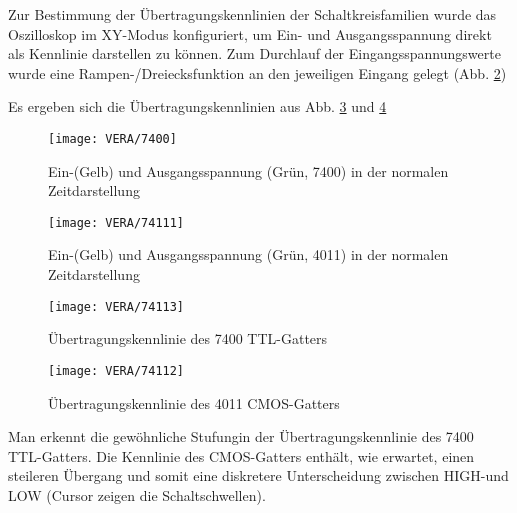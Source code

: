 Zur Bestimmung der Übertragungskennlinien der Schaltkreisfamilien wurde das
Oszilloskop im XY-Modus konfiguriert, um Ein- und Ausgangsspannung direkt als
Kennlinie darstellen zu können. Zum Durchlauf der Eingangsspannungswerte wurde
eine Rampen-/Dreiecksfunktion an den jeweiligen Eingang gelegt (Abb. \ref{fig:triangle}) 

Es ergeben sich die Übertragungskennlinien aus
Abb. \ref{fig:first} und \ref{fig:last}

  \begin{figure}[H]
  \begin{center}
    \texttt{[image: VERA/7400]}
  \end{center}
  \caption{Ein-(Gelb) und Ausgangsspannung (Grün, 7400) in der normalen Zeitdarstellung}
  \label{fig:triangle2}
\end{figure}

  \begin{figure}[H]
  \begin{center}
    \texttt{[image: VERA/74111]}
  \end{center}
  \caption{Ein-(Gelb) und Ausgangsspannung (Grün, 4011) in der normalen Zeitdarstellung}
  \label{fig:triangle}
\end{figure}

  \begin{figure}[H]
  \begin{center}
    \texttt{[image: VERA/74113]}
  \end{center}
  \caption{Übertragungskennlinie des 7400 TTL-Gatters}
  \label{fig:first}
\end{figure}

  \begin{figure}[H]
  \begin{center}
    \texttt{[image: VERA/74112]}
  \end{center}
  \caption{Übertragungskennlinie des 4011 CMOS-Gatters}
  \label{fig:last}
\end{figure}

Man erkennt die gewöhnliche \glqq Stufung\grqq in der Übertragungskennlinie des
7400 TTL-Gatters. Die Kennlinie des CMOS-Gatters enthält, wie erwartet, einen
steileren Übergang und somit eine diskretere Unterscheidung zwischen HIGH-und
LOW (Cursor zeigen die Schaltschwellen).

